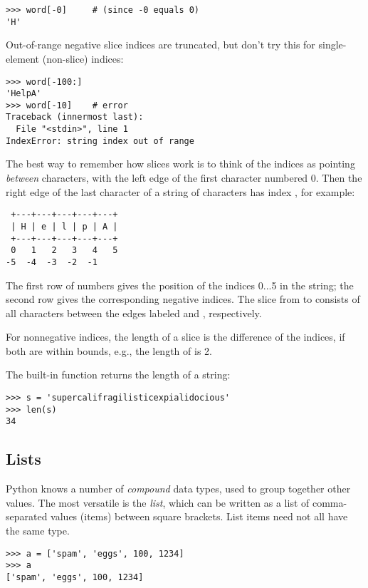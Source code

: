 \documentclass{manual}
\begin{document}
\begin{verbatim}
>>> word[-0]     # (since -0 equals 0)
'H'
\end{verbatim}

Out-of-range negative slice indices are truncated, but don't try this
for single-element (non-slice) indices:

\begin{verbatim}
>>> word[-100:]
'HelpA'
>>> word[-10]    # error
Traceback (innermost last):
  File "<stdin>", line 1
IndexError: string index out of range
\end{verbatim}

The best way to remember how slices work is to think of the indices as
pointing \emph{between} characters, with the left edge of the first
character numbered 0.  Then the right edge of the last character of a
string of  characters has index , for example:

\begin{verbatim}
 +---+---+---+---+---+ 
 | H | e | l | p | A |
 +---+---+---+---+---+ 
 0   1   2   3   4   5 
-5  -4  -3  -2  -1
\end{verbatim}

The first row of numbers gives the position of the indices 0...5 in
the string; the second row gives the corresponding negative indices.
The slice from  to  consists of all characters between
the edges labeled  and , respectively.

For nonnegative indices, the length of a slice is the difference of
the indices, if both are within bounds, e.g., the length of
 is 2.

The built-in function  returns the length of a string:

\begin{verbatim}
>>> s = 'supercalifragilisticexpialidocious'
>>> len(s)
34
\end{verbatim}

\subsection{Lists}
\label{lists}

Python knows a number of \emph{compound} data types, used to group
together other values.  The most versatile is the \emph{list}, which
can be written as a list of comma-separated values (items) between
square brackets.  List items need not all have the same type.

\begin{verbatim}
>>> a = ['spam', 'eggs', 100, 1234]
>>> a
['spam', 'eggs', 100, 1234]
\end{verbatim}
\end{document}
